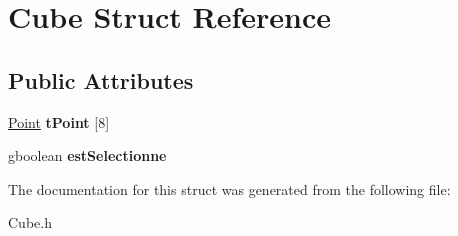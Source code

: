 \hypertarget{structCube}{
\section{Cube Struct Reference}
\label{structCube}
}
\subsection*{Public Attributes}
\begin{DoxyCompactItemize}
\item 
\hypertarget{structCube_a278a5478983b7626c920c51e036fb020}{
\hyperlink{structPoint}{Point} {\bfseries tPoint} \mbox{[}8\mbox{]}}
\label{structCube_a278a5478983b7626c920c51e036fb020}

\item 
\hypertarget{structCube_aabaca411b8345f1c5744f55d6eabb9dd}{
gboolean {\bfseries estSelectionne}}
\label{structCube_aabaca411b8345f1c5744f55d6eabb9dd}

\end{DoxyCompactItemize}


The documentation for this struct was generated from the following file:\begin{DoxyCompactItemize}
\item 
Cube.h\end{DoxyCompactItemize}
